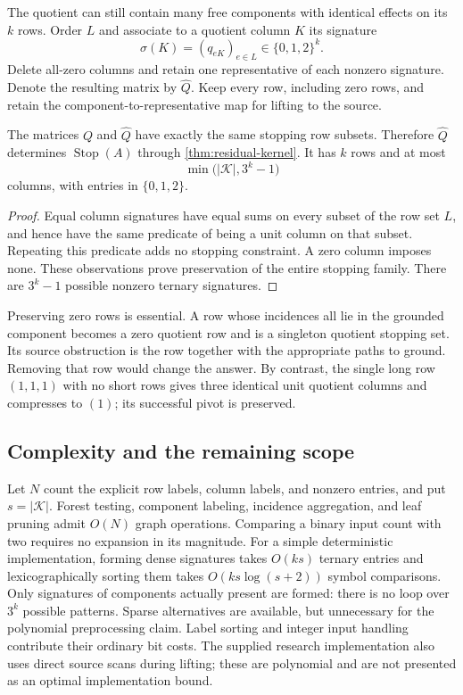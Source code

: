 The quotient can still contain many free components with identical effects
on its $k$ rows. Order $L$ and associate to a quotient column $K$ its
signature
\[
 \sigma(K)=(q_{eK})_{e\in L}\in\{0,1,2\}^{k}.
\]
Delete all-zero columns and retain one representative of each nonzero
signature. Denote the resulting matrix by $\widehat Q$. Keep every row,
including zero rows, and retain the component-to-representative map for
lifting to the source.

\begin{corollary}
\label{cor:pattern-kernel}
The matrices $Q$ and $\widehat Q$ have exactly the same stopping row
subsets. Therefore $\widehat Q$ determines
$\operatorname{Stop}(A)$ through \cref{thm:residual-kernel}. It has $k$
rows and at most
\[
 \min\bigl(|\mathcal K|,3^k-1\bigr)
\]
columns, with entries in $\{0,1,2\}$.
\end{corollary}

\begin{proof}
Equal column signatures have equal sums on every subset of the row set
$L$, and hence have the same predicate of being a unit column on that
subset. Repeating this predicate adds no stopping constraint. A zero
column imposes none. These observations prove preservation of the entire
stopping family. There are $3^k-1$ possible nonzero ternary signatures.
\end{proof}

Preserving zero rows is essential. A row whose incidences all lie in the
grounded component becomes a zero quotient row and is a singleton
quotient stopping set. Its source obstruction is the row together with
the appropriate paths to ground. Removing that row would change the
answer. By contrast, the single long row $(1,1,1)$ with no short rows
gives three identical unit quotient columns and compresses to $(1)$;
its successful pivot is preserved.

\subsection{Complexity and the remaining scope}

Let $N$ count the explicit row labels, column labels, and nonzero entries,
and put $s=|\mathcal K|$. Forest testing, component labeling, incidence
aggregation, and leaf pruning admit $O(N)$ graph operations. Comparing a
binary input count with two requires no expansion in its magnitude.
For a simple deterministic implementation, forming dense signatures takes
$O(ks)$ ternary entries and lexicographically sorting them takes
$O(ks\log(s+2))$ symbol comparisons. Only signatures of components
actually present are formed: there is no loop over $3^k$ possible
patterns. Sparse alternatives are available, but unnecessary for the
polynomial preprocessing claim. Label sorting and integer input handling
contribute their ordinary bit costs. The supplied research implementation
also uses direct source scans during lifting; these are polynomial and
are not presented as an optimal implementation bound.

